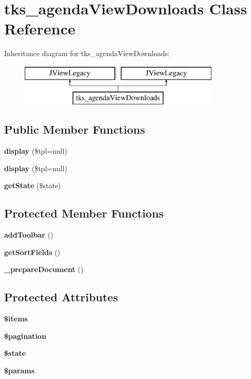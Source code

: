 \section{tks\+\_\+agenda\+View\+Downloads Class Reference}
\label{classtks__agenda_view_downloads}
Inheritance diagram for tks\+\_\+agenda\+View\+Downloads\+:\begin{figure}[H]
\begin{center}
\leavevmode
\includegraphics[height=2.000000cm]{classtks__agenda_view_downloads}
\end{center}
\end{figure}
\subsection*{Public Member Functions}
\begin{DoxyCompactItemize}
\item 
\textbf{ display} (\$tpl=null)
\item 
\textbf{ display} (\$tpl=null)
\item 
\textbf{ get\+State} (\$state)
\end{DoxyCompactItemize}
\subsection*{Protected Member Functions}
\begin{DoxyCompactItemize}
\item 
\textbf{ add\+Toolbar} ()
\item 
\textbf{ get\+Sort\+Fields} ()
\item 
\textbf{ \+\_\+prepare\+Document} ()
\end{DoxyCompactItemize}
\subsection*{Protected Attributes}
\begin{DoxyCompactItemize}
\item 
\textbf{ \$items}
\item 
\textbf{ \$pagination}
\item 
\textbf{ \$state}
\item 
\textbf{ \$params}
\end{DoxyCompactItemize}



